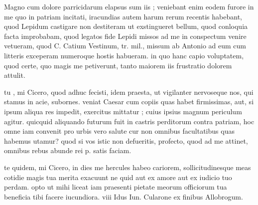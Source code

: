  Magno cum dolore parricidarum elapsus sum iis ; veniebant enim eodem furore in me quo in patriam incitati, iracundias autem harum rerum recentis habebant, quod Lepidum castigare non destiteram ut exstingueret bellum, quod conloquia facta improbabam, quod legatos fide Lepidi missos ad me in conspectum venire vetueram, quod C. Catium Vestinum, tr. mil., missum ab Antonio ad eum cum litteris exceperam numeroque hostis habueram. in quo hanc capio voluptatem, quod certe, quo magis me petiverunt, tanto maiorem iis frustratio dolorem attulit.

 tu , mi Cicero, quod adhuc fecisti, idem praesta, ut vigilanter nervoseque nos, qui stamus in acie, subornes. veniat Caesar cum copiis quas habet firmissimas, aut, si ipsum aliqua res impedit, exercitus mittatur ; cuius ipsius magnum periculum agitur. quicquid aliquando futurum fuit in castris perditorum contra patriam, hoc omne iam convenit pro urbis vero salute cur non omnibus facultatibus quas habemus utamur? quod si vos istic non defueritis, profecto, quod ad me attinet, omnibus rebus abunde rei p. satis faciam.

 te quidem, mi Cicero, in dies me hercules habeo cariorem, sollicitudinesque meas cotidie magis tua merita exacuunt ne quid aut ex amore aut ex iudicio tuo perdam. opto ut mihi liceat iam praesenti pietate meorum officiorum tua beneficia tibi facere iucundiora. viii Idus Iun. Cularone ex finibus Allobrogum.
